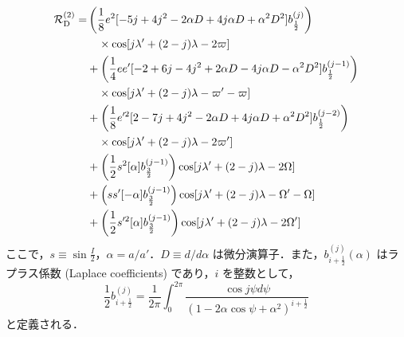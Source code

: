 \documentclass[11pt,a4paper,oneside,onecolumn]{jreport}
\begin{document}
\begin{equation}
\begin{split}
{\cal R}_{\rm D}^{(2)} = & \left( \frac{1}{8} e^2 [-5 j + 4 j^2 - 2 \alpha D + 4 j \alpha D + \alpha^2 D^2] b_{ \frac{1}{2} }^{(j)} \right) \\
& \quad \times \cos [j \lambda' + (2 - j) \lambda - 2 \varpi ] \\
& + \left( \frac{1}{4} e e' [ -2 + 6 j - 4 j^2 + 2 \alpha D - 4 j \alpha D - \alpha^2 D^2] b_{ \frac{1}{2} }^{(j - 1)} \right) \\
& \quad \times \cos [j \lambda' + (2 -j) \lambda - \varpi' - \varpi ] \\
& + \left( \frac{1}{8} e'^2 [2 -7 j + 4 j^2 - 2 \alpha D + 4 j \alpha D + \alpha^2 D^2] b_{ \frac{1}{2} }^{(j - 2)} \right) \\
& \quad \times \cos [j \lambda' + (2 - j) \lambda - 2 \varpi' ] \\
& + \left( \frac{1}{2} s^2 [ \alpha ] b_{ \frac{3}{2} }^{(j - 1)} \right) \cos [j \lambda' + (2 - j) \lambda - 2 \Omega ] \\
& + \left( s s' [ - \alpha ] b_{ \frac{3}{2} }^{(j - 1)} \right) \cos [j \lambda' + (2 - j) \lambda - \Omega' - \Omega] \\
& + \left( \frac{1}{2} s'^2 [ \alpha ] b_{ \frac{3}{2} }^{(j - 1)} \right) \cos [j \lambda' + (2 - j) \lambda - 2 \Omega' ]
\end{split} \label{eq:cal_RD(2)}
\end{equation}
ここで，$s \equiv \sin \frac{I}{2}$，$\alpha = a/a'$．$D \equiv d/d \alpha$ は微分演算子．また，$b_{i + \frac{1}{2}}^{(j)}(\alpha)$ はラプラス係数 (Laplace coefficients) であり，$i$ を整数として，
\begin{equation}
\frac{1}{2} b_{i + \frac{1}{2}}^{(j)} = \frac{1}{2 \pi} \int_0^{2 \pi} \frac{\cos j \psi d \psi}{(1 - 2 \alpha \cos \psi + \alpha^2)^{i + \frac{1}{2}}}
\end{equation}
と定義される．
\end{document}
